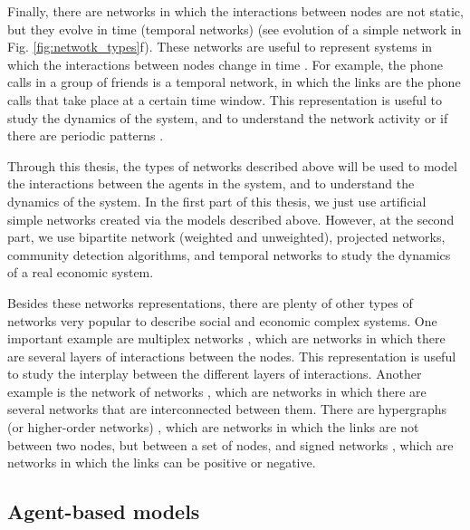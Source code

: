 Finally, there are networks in which the interactions between nodes are not static, but they evolve in time (temporal networks) \cite{Holme2012Temporal} (see evolution of a simple network in Fig. \ref{fig:netwotk_types}f). These networks are useful to represent systems in which the interactions between nodes change in time \cite{Perra2012ActivityDriven}. For example, the phone calls in a group of friends is a temporal network, in which the links are the phone calls that take place at a certain time window. This representation is useful to study the dynamics of the system, and to understand the network activity \cite{karsai-2011} or if there are periodic patterns \cite{Jo2012Circadian}.

Through this thesis, the types of networks described above will be used to model the interactions between the agents in the system, and to understand the dynamics of the system. In the first part of this thesis, we just use artificial simple networks created via the models described above. However, at the second part, we use bipartite network (weighted and unweighted), projected networks, community detection algorithms, and temporal networks to study the dynamics of a real economic system. 

Besides these networks representations, there are plenty of other types of networks very popular to describe social and economic complex systems. One important example are multiplex networks \cite{gomez-2013,kivela2014multilayer,de2013mathematical}, which are networks in which there are several layers of interactions between the nodes. This representation is useful to study the interplay between the different layers of interactions. Another example is the network of networks \cite{gao2011robustness, d2014networks}, which are networks in which there are several networks that are interconnected between them. There are hypergraphs (or higher-order networks) \cite{battiston-2021}, which are networks in which the links are not between two nodes, but between a set of nodes, and signed networks \cite{leskovec2010signed}, which are networks in which the links can be positive or negative. 


\subsection{\label{subsec:Agent-based models} Agent-based models}

